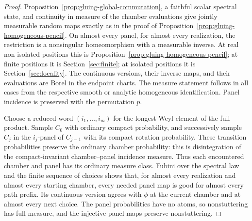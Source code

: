 \begin{proof}
Proposition~\ref{prop:gluing-global-commutation}, a
faithful scalar spectral state, and continuity in
measure of the chamber evaluations give jointly
measurable random maps exactly as in the proof of
Proposition~\ref{prop:gluing-homogeneous-pencil}.
On almost every panel, for almost every realization,
the restriction is a nonsingular homeomorphism
with a measurable inverse.  At real non-isolated
positions this is
Proposition~\ref{prop:gluing-homogeneous-pencil};
at finite positions it is Section~\ref{sec:finite};
at isolated positions it is Section~\ref{sec:locality}.
The continuous versions, their inverse maps, and
their evaluations are Borel in the endpoint
charts.  The measure statement follows in all
cases from the respective smooth or analytic
homogeneous identification.  Panel incidence
is preserved with the permutation $p$.

Choose a reduced word $(i_1,\ldots,i_m)$ for the
longest Weyl element of the full product.
Sample $C_0$ with ordinary compact probability,
and successively sample $C_j$ in the
$i_j$-panel of $C_{j-1}$ with its compact
rotation probability.  These transition
probabilities preserve the ordinary chamber
probability: this is disintegration of the
compact-invariant chamber--panel incidence
measure.  Thus each encountered chamber and
panel has its ordinary measure class.
Fubini over the spectral law and the finite
sequence of choices shows that, for almost
every realization and almost every starting
chamber, every needed panel map is good for
almost every path prefix.  Its continuous
version agrees with $\phi$ at the current
chamber and at almost every next choice.
The panel probabilities have no atoms, so
nonstuttering has full measure, and the
injective panel maps preserve nonstuttering.


\end{proof}
